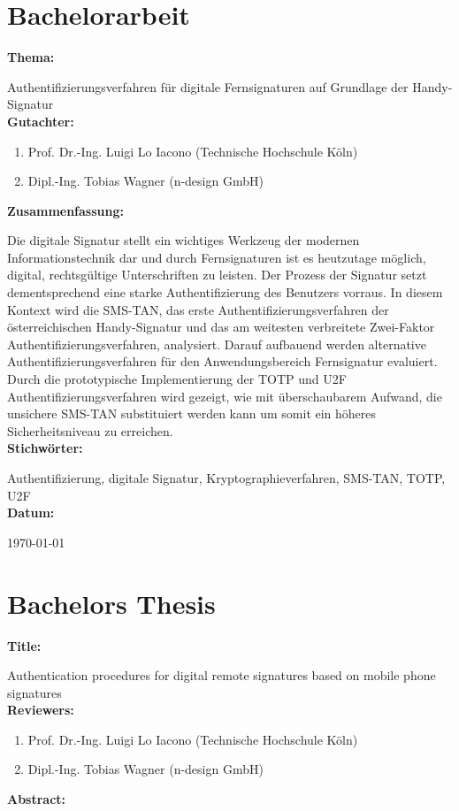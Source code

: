 \chapter*{Bachelorarbeit}
\textbf{Thema:}

Authentifizierungsverfahren für digitale Fernsignaturen auf Grundlage der Handy-Signatur
\\[4ex]
\textbf{Gutachter:}
\begin{enumerate}
    \item Prof. Dr.-Ing. Luigi Lo Iacono (Technische Hochschule Köln)
    \item Dipl.-Ing. Tobias Wagner (n-design GmbH)
\end{enumerate}
\textbf{Zusammenfassung:}

Die digitale Signatur stellt ein wichtiges Werkzeug der modernen Informationstechnik dar und durch Fernsignaturen ist es heutzutage möglich, digital, rechtsgültige Unterschriften zu leisten. Der Prozess der Signatur setzt dementsprechend eine starke Authentifizierung des Benutzers vorraus. In diesem Kontext wird die SMS-TAN, das erste Authentifizierungsverfahren der österreichischen Handy-Signatur und das am weitesten verbreitete Zwei-Faktor Authentifizierungsverfahren, analysiert. Darauf aufbauend werden alternative Authentifizierungsverfahren für den Anwendungsbereich Fernsignatur evaluiert. Durch die prototypische Implementierung der TOTP und U2F Authentifizierungsverfahren wird gezeigt, wie mit überschaubarem Aufwand, die unsichere SMS-TAN substituiert werden kann um somit ein höheres Sicherheitsniveau zu erreichen.
\\[4ex]
\textbf{Stichwörter:}

Authentifizierung, digitale Signatur, Kryptographieverfahren, SMS-TAN, TOTP, U2F
\\[4ex]
\textbf{Datum:}

\today
\clearpage

\chapter*{Bachelors Thesis}
\textbf{Title:}

Authentication procedures for digital remote signatures based on mobile phone signatures
\\[4ex]
\textbf{Reviewers:}
\begin{enumerate}
    \item Prof. Dr.-Ing. Luigi Lo Iacono (Technische Hochschule Köln)
    \item Dipl.-Ing. Tobias Wagner (n-design GmbH)
\end{enumerate}
\textbf{Abstract:}

